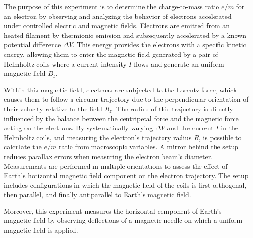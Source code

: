 
%


The purpose of this experiment is to determine the charge-to-mass ratio $e/m$ for an electron by observing and analyzing the behavior of electrons accelerated under controlled electric and magnetic fields. Electrons are emitted from an heated filament by thermionic emission and subsequently accelerated by a known potential difference $\Delta V$. This energy provides the electrons with a specific kinetic energy, allowing them to enter the magnetic field generated by a pair of Helmholtz coils where a current intensity $I$ flows and generate an uniform magnetic field $B_z$. 

Within this magnetic field, electrons are subjected to the Lorentz force, which causes them to follow a circular trajectory due to the perpendicular orientation of their velocity relative to the field $B_z$. The radius of this trajectory is directly influenced by the balance between the centripetal force and the magnetic force acting on the electrons. 
By systematically varying $\Delta V$ and the current $I$ in the Helmholtz coils, and measuring the electron's trajectory radius $R$, is possible to calculate the $e/m$ ratio from macroscopic variables. 
A mirror behind the setup reduces parallax errors when measuring the electron beam's diameter. 
Measurements are performed in multiple orientations to assess the effect of Earth’s horizontal magnetic field component on the electron trajectory. The setup includes configurations in which the magnetic field of the coils is first orthogonal, then parallel, and finally antiparallel to Earth’s magnetic field.

Moreover, this experiment measures the horizontal component of Earth’s magnetic field by observing deflections of a magnetic needle on which a uniform magnetic field is applied.


